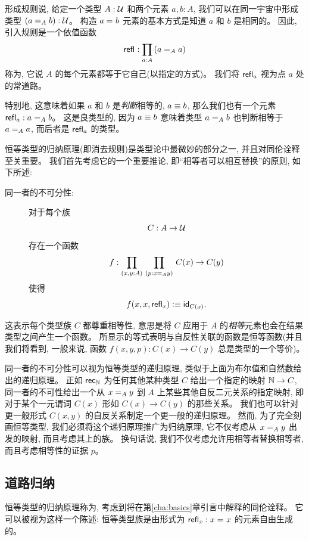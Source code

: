 形成规则说, 给定一个类型 $A:\UU$ 和两个元素 $a,b:A$, 我们可以在同一宇宙中形成类型 $(\id[A]{a}{b}):\UU$。
构造 $\id{a}{b}$ 元素的基本方式是知道 $a$ 和 $b$ 是相同的。
因此, 引入规则是一个依值函数
\[\refl{} : \prd{a:A} (\id[A]{a}{a})\]
称为,
%
它说 $A$ 的每个元素都等于它自己(以指定的方式)。
我们将 $\refl{a}$ 视为点 $a$ 处的常道路。

特别地, 这意味着如果 $a$ 和 $b$ 是\emph{判断}相等的, $a\jdeq b$, 那么我们也有一个元素 $\refl{a} : \id[A]{a}{b}$。
这是良类型的, 因为 $a\jdeq b$ 意味着类型 $\id[A]{a}{b}$ 也判断相等于 $\id[A]{a}{a}$, 而后者是 $\refl{a}$ 的类型。

恒等类型的归纳原理(即消去规则)是类型论中最微妙的部分之一, 并且对同伦诠释至关重要。
我们首先考虑它的一个重要推论, 即``相等者可以相互替换''的原则, 如下所述:
%
%
\begin{description}
\item[同一者的不可分性:]
对于每个族
\[
C : A \to \UU
\]
存在一个函数
\[
f : \prd{x,y:A}{p:\id[A] x y} C(x) \to C(y)
\]
使得
\[
f(x,x,\refl{x}) \defeq \idfunc[C(x)].
\]
\end{description}
这表示每个类型族 $C$ 都尊重相等性, 意思是将 $C$ 应用于 $A$ 的\emph{相等}元素也会在结果类型之间产生一个函数。
所显示的等式表明与自反性关联的函数是恒等函数(并且我们将看到, 一般来说, 函数 $f(x,y,p): C(x) \to C(y)$ 总是类型的一个等价)。

同一者的不可分性可以视为恒等类型的递归原理, 类似于上面为布尔值和自然数给出的递归原理。
正如 $\rec{\nat}$ 为任何其他某种类型 $C$ 给出一个指定的映射 $\nat\to C$, 
同一者的不可性给出一个从 $\id[A] x y$ 到 $A$ 上某些其他自反二元关系的指定映射, 即对于某个一元谓词 $C(x)$ 形如 $C(x) \to C(y)$ 的那些关系。
我们也可以针对更一般形式 $C(x,y)$ 的自反关系制定一个更一般的递归原理。
然而, 为了完全刻画恒等类型, 我们必须将这个递归原理推广为归纳原理, 它不仅考虑从 $\id[A] x y$ 出发的映射, 而且考虑其上的族。
换句话说, 我们不仅考虑允许用相等者替换相等者, 而且考虑相等性的证据 $p$。

\subsection{道路归纳}

恒等类型的归纳原理称为,
%
%
考虑到将在第\ref{cha:basics}章引言中解释的同伦诠释。
它可以被视为这样一个陈述: 恒等类型族是由形式为 $\refl{x}: \id{x}{x}$ 的元素自由生成的。

